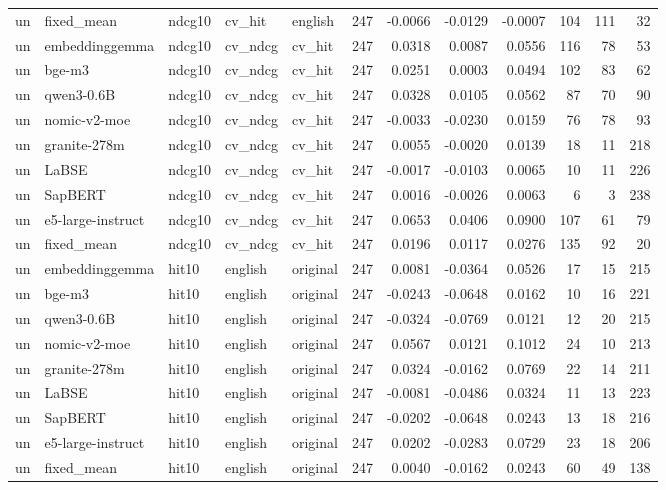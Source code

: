 \begin{tabular}{lllllrrrrrrr}
un & fixed\_mean & ndcg10 & cv\_hit & english & 247 & -0.0066 & -0.0129 & -0.0007 & 104 & 111 & 32 \\
un & embeddinggemma & ndcg10 & cv\_ndcg & cv\_hit & 247 & 0.0318 & 0.0087 & 0.0556 & 116 & 78 & 53 \\
un & bge-m3 & ndcg10 & cv\_ndcg & cv\_hit & 247 & 0.0251 & 0.0003 & 0.0494 & 102 & 83 & 62 \\
un & qwen3-0.6B & ndcg10 & cv\_ndcg & cv\_hit & 247 & 0.0328 & 0.0105 & 0.0562 & 87 & 70 & 90 \\
un & nomic-v2-moe & ndcg10 & cv\_ndcg & cv\_hit & 247 & -0.0033 & -0.0230 & 0.0159 & 76 & 78 & 93 \\
un & granite-278m & ndcg10 & cv\_ndcg & cv\_hit & 247 & 0.0055 & -0.0020 & 0.0139 & 18 & 11 & 218 \\
un & LaBSE & ndcg10 & cv\_ndcg & cv\_hit & 247 & -0.0017 & -0.0103 & 0.0065 & 10 & 11 & 226 \\
un & SapBERT & ndcg10 & cv\_ndcg & cv\_hit & 247 & 0.0016 & -0.0026 & 0.0063 & 6 & 3 & 238 \\
un & e5-large-instruct & ndcg10 & cv\_ndcg & cv\_hit & 247 & 0.0653 & 0.0406 & 0.0900 & 107 & 61 & 79 \\
un & fixed\_mean & ndcg10 & cv\_ndcg & cv\_hit & 247 & 0.0196 & 0.0117 & 0.0276 & 135 & 92 & 20 \\
un & embeddinggemma & hit10 & english & original & 247 & 0.0081 & -0.0364 & 0.0526 & 17 & 15 & 215 \\
un & bge-m3 & hit10 & english & original & 247 & -0.0243 & -0.0648 & 0.0162 & 10 & 16 & 221 \\
un & qwen3-0.6B & hit10 & english & original & 247 & -0.0324 & -0.0769 & 0.0121 & 12 & 20 & 215 \\
un & nomic-v2-moe & hit10 & english & original & 247 & 0.0567 & 0.0121 & 0.1012 & 24 & 10 & 213 \\
un & granite-278m & hit10 & english & original & 247 & 0.0324 & -0.0162 & 0.0769 & 22 & 14 & 211 \\
un & LaBSE & hit10 & english & original & 247 & -0.0081 & -0.0486 & 0.0324 & 11 & 13 & 223 \\
un & SapBERT & hit10 & english & original & 247 & -0.0202 & -0.0648 & 0.0243 & 13 & 18 & 216 \\
un & e5-large-instruct & hit10 & english & original & 247 & 0.0202 & -0.0283 & 0.0729 & 23 & 18 & 206 \\
un & fixed\_mean & hit10 & english & original & 247 & 0.0040 & -0.0162 & 0.0243 & 60 & 49 & 138 \\

\end{tabular}
